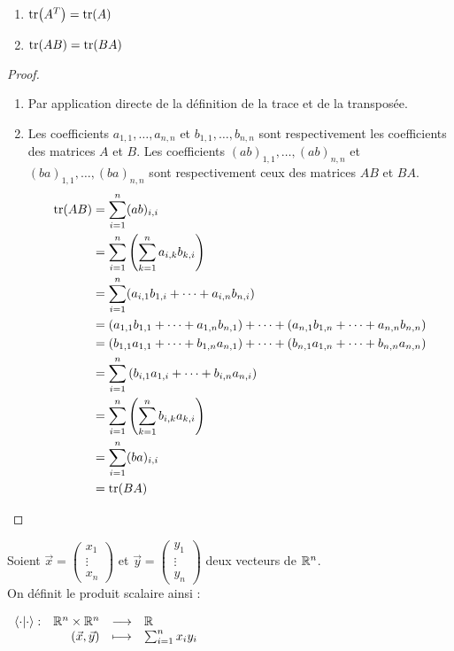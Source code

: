 \begin{lemma}
	\begin{multicols}{2}
	    \begin{enumerate}
    		\item $\tr(A^T) = \tr(A)$
    		\item $\tr(A B) = \tr(B A)$
    	\end{enumerate}
	\end{multicols}
\end{lemma}

\begin{proof}
	\leavevmode
    \begin{enumerate}
        \item Par application directe de la définition de la trace et de la transposée.
        \item Les coefficients $a_{1,1}, \ldots, a_{n,n}$ et $b_{1,1}, \ldots, b_{n,n}$ sont respectivement les coefficients des matrices $A$ et $B$. Les coefficients $(ab)_{1,1}, \ldots, (ab)_{n,n}$ et $(ba)_{1,1}, \ldots, (ba)_{n,n}$ sont respectivement ceux des matrices $AB$ et $BA$.
        \begin{align*}
        	\tr(AB) &= \sum_{i=1}^n (ab)_{i,i} \\
        			&= \sum_{i=1}^n \left( \sum_{k=1}^n a_{i,k} b_{k,i} \right) \\
        			&= \sum_{i=1}^n (a_{i,1} b_{1,i} + \cdots + a_{i,n} b_{n,i}) \\
        			&= (a_{1,1} b_{1,1} + \cdots + a_{1,n} b_{n,1}) + \cdots + (a_{n,1} b_{1,n} + \cdots + a_{n,n} b_{n,n}) \\
        			&= (b_{1,1}a_{1,1} + \cdots + b_{1,n}a_{n,1}) + \cdots + (b_{n,1} a_{1,n} + \cdots + b_{n,n} a_{n,n}) \\
        			&= \sum_{i=1}^n \left( b_{i,1} a_{1,i} + \cdots + b_{i,n} a_{n,i} \right) \\
        			&= \sum_{i=1}^n \left( \sum_{k=1}^n b_{i,k} a_{k,i} \right) \\
        			&= \sum_{i=1}^n (ba)_{i,i} \\
        			&= \tr(BA)
        \end{align*}
    \end{enumerate}
\end{proof}

\begin{definition} 
	Soient $\vec{x} = \begin{pmatrix} x_1 \\ \vdots \\ x_n \end{pmatrix}$ et $\vec{y} = \begin{pmatrix} y_1 \\ \vdots \\ y_n \end{pmatrix}$ deux vecteurs de $\mathbb{R}^n$.
	\\
	On définit le produit scalaire ainsi :
	\begin{center}
		$
		\begin{array}{rrcl} \langle \cdot | \cdot \rangle : & \mathbb{R}^n \times \mathbb{R}^n & \longrightarrow & \mathbb{R} \\ & (\vec{x}, \vec{y}) & \longmapsto & \sum_{i = 1}^n x_i y_i \end{array}
		$
	\end{center}
\end{definition}

